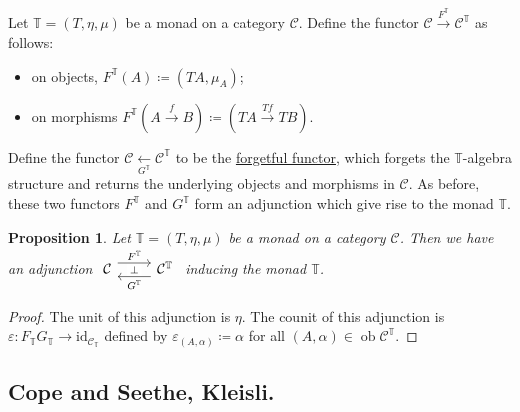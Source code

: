 \documentclass[a4paper,11pt]{article}
\theoremstyle{break_italics}
\newtheorem*{proposition*}{Proposition}
\theoremstyle{break_upright}
\theoremstyle{remark}
\newcommand{\id}{\mathrm{id}}
\newcommand{\ob}{\operatorname{ob}}
\newcommand{\C}{\mathcal{C}}
\begin{document}
Let $\mathbb T = (T, \eta, \mu)$ be a monad on a category $\C$. Define the functor $\C \xrightarrow{F^\mathbb T} \C^{\mathbb T}$ as follows:
	\begin{itemize}
		\item on objects, $F^{\mathbb T}(A) \coloneqq (TA, \mu_A)$;
		\item on morphisms $F^{\mathbb T}(A \xrightarrow{f} B) \coloneqq (TA \xrightarrow{Tf} TB)$.
	\end{itemize}
	Define the functor $\C \xleftarrow[G^\mathbb T]{} \C^{\mathbb T}$ to be the \uline{forgetful functor}, which forgets the $\mathbb T$-algebra structure and returns the underlying objects and morphisms in $\C$. As before, these two functors $F^\mathbb T$ and $G^\mathbb T$ form an adjunction which give rise to the monad $\mathbb T$.

\begin{proposition*}
Let $\mathbb T = (T, \eta, \mu)$ be a monad on a category $\C$. Then we have an adjunction $\begin{tikzcd}
	\C & \C^{\mathbb T}
	\arrow["\bot"{description}, draw=none, from=1-1, to=1-2]
	\arrow["F^{\mathbb T}", shift left=2, from=1-1, to=1-2]
	\arrow["G^{\mathbb T}", shift left=2, from=1-2, to=1-1]
\end{tikzcd}$ inducing the monad $\mathbb T$.
\end{proposition*}
\begin{proof}
The unit of this adjunction is $\eta$. The counit of this adjunction is $\varepsilon \colon F_{\mathbb T} G_{\mathbb T} \to \id_{\C_{\mathbb T}}$ defined by $\varepsilon_{(A,\alpha)} \coloneqq \alpha$ for all $(A,\alpha) \in \ob \C^{\mathbb T}$.
\end{proof}






\subsection{Cope and Seethe, Kleisli.}
\end{document}
